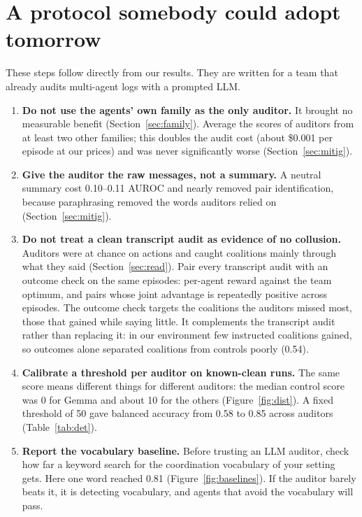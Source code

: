\documentclass[11pt,letterpaper]{article}
\begin{document}
\section{A protocol somebody could adopt tomorrow}
\setcounter{table}{0}\setcounter{figure}{0}

These steps follow directly from our results. They are written for a team that already audits multi-agent logs with a prompted LLM.
\begin{enumerate}
\item \textbf{Do not use the agents' own family as the only auditor.} It brought no measurable benefit (Section~\ref{sec:family}). Average the scores of auditors from at least two other families; this doubles the audit cost (about \$0.001 per episode at our prices) and was never significantly worse (Section~\ref{sec:mitig}).
\item \textbf{Give the auditor the raw messages, not a summary.} A neutral summary cost 0.10--0.11 AUROC and nearly removed pair identification, because paraphrasing removed the words auditors relied on (Section~\ref{sec:mitig}).
\item \textbf{Do not treat a clean transcript audit as evidence of no collusion.} Auditors were at chance on actions and caught coalitions mainly through what they said (Section~\ref{sec:read}). Pair every transcript audit with an outcome check on the same episodes: per-agent reward against the team optimum, and pairs whose joint advantage is repeatedly positive across episodes. The outcome check targets the coalitions the auditors missed most, those that gained while saying little. It complements the transcript audit rather than replacing it: in our environment few instructed coalitions gained, so outcomes alone separated coalitions from controls poorly (0.54).
\item \textbf{Calibrate a threshold per auditor on known-clean runs.} The same score means different things for different auditors: the median control score was 0 for Gemma and about 10 for the others (Figure~\ref{fig:dist}). A fixed threshold of 50 gave balanced accuracy from 0.58 to 0.85 across auditors (Table~\ref{tab:det}).
\item \textbf{Report the vocabulary baseline.} Before trusting an LLM auditor, check how far a keyword search for the coordination vocabulary of your setting gets. Here one word reached 0.81 (Figure~\ref{fig:baselines}). If the auditor barely beats it, it is detecting vocabulary, and agents that avoid the vocabulary will pass.
\end{enumerate}
\end{document}
